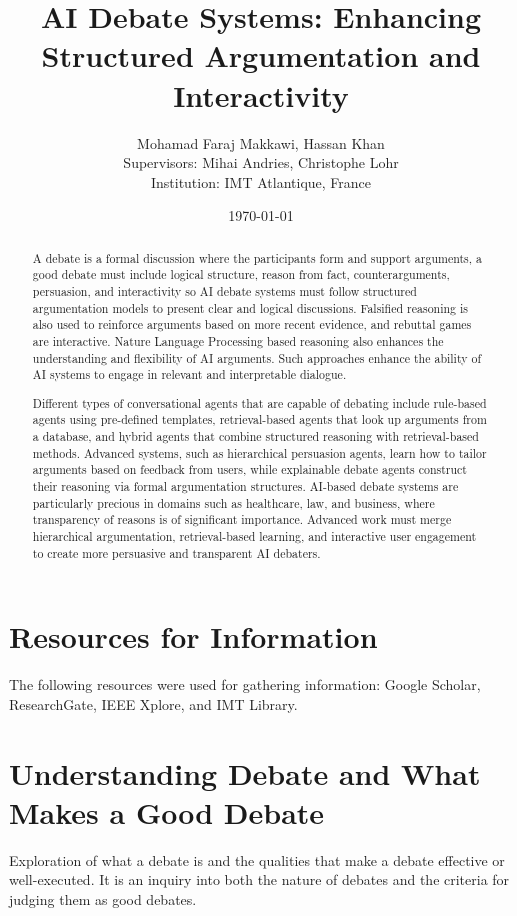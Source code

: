 \documentclass[12pt]{article}
\title{AI Debate Systems: Enhancing Structured Argumentation and Interactivity}
\author{Mohamad Faraj Makkawi, Hassan Khan\\
    Supervisors: Mihai Andries, Christophe Lohr\\
    Institution: IMT Atlantique, France}
\date{\today}
\begin{document}
\maketitle

\begin{abstract}
    A debate is a formal discussion where the participants form and support arguments, a good debate must include logical structure, reason from fact, counterarguments, persuasion, and interactivity so AI debate systems must follow structured argumentation models to present clear and logical discussions. Falsified reasoning is also used to reinforce arguments based on more recent evidence, and rebuttal games are interactive. Nature Language Processing based reasoning also enhances the understanding and flexibility of AI arguments. Such approaches enhance the ability of AI systems to engage in relevant and interpretable dialogue.

    Different types of conversational agents that are capable of debating include rule-based agents using pre-defined templates, retrieval-based agents that look up arguments from a database, and hybrid agents that combine structured reasoning with retrieval-based methods. Advanced systems, such as hierarchical persuasion agents, learn how to tailor arguments based on feedback from users, while explainable debate agents construct their reasoning via formal argumentation structures. AI-based debate systems are particularly precious in domains such as healthcare, law, and business, where transparency of reasons is of significant importance. Advanced work must merge hierarchical argumentation, retrieval-based learning, and interactive user engagement to create more persuasive and transparent AI debaters.
\end{abstract}

\section*{Resources for Information}
\begin{small}
    The following resources were used for gathering information: Google Scholar, ResearchGate, IEEE Xplore, and IMT Library.
\end{small}

\section{Understanding Debate and What Makes a Good Debate}
\begin{small}
    Exploration of what a debate is and the qualities that make a debate effective or well-executed. It is an inquiry into both the nature of debates and the criteria for judging them as good debates.
\end{small}
\end{document}
